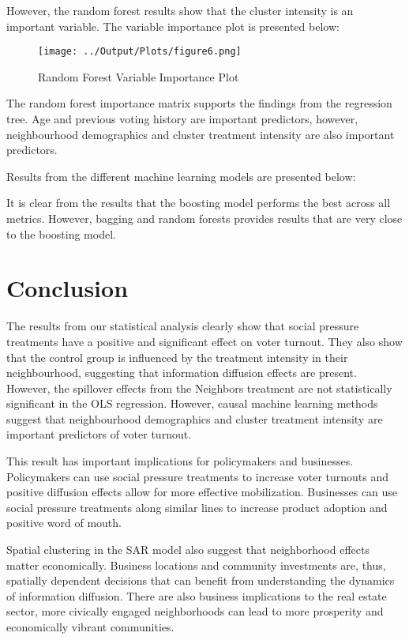 \documentclass[11pt]{article}
\begin{document}
However, the random forest results show that the cluster intensity is an important variable. The variable importance plot is presented below:
\begin{figure}[H]
    \centering
    \texttt{[image: ../Output/Plots/figure6.png]}   
    \caption{Random Forest Variable Importance Plot}
    \label{fig:random_forest}
\end{figure}
The random forest importance matrix supports the findings from the regression tree. Age and previous voting history are important predictors, however, neighbourhood demographics and cluster treatment intensity are also important predictors.

Results from the different machine learning models are presented below:


It is clear from the results that the boosting model performs the best across all metrics. However, bagging and random forests provides results that are very close to the boosting model. 


\section{Conclusion}
The results from our statistical analysis clearly show that social pressure treatments have a positive and significant effect on voter turnout. They also show that the control group is influenced by the treatment intensity in their neighbourhood, suggesting that information diffusion effects are present. However, the spillover effects from the Neighbors treatment are not statistically significant in the OLS regression. However, causal machine learning methods suggest that neighbourhood demographics and cluster treatment intensity are important predictors of voter turnout.

This result has important implications for policymakers and businesses. Policymakers can use social pressure treatments to increase voter turnouts and positive diffusion effects allow for more effective mobilization. Businesses can use social pressure treatments along similar lines to increase product adoption and positive word of mouth. 

Spatial clustering in the SAR model also suggest that neighborhood effects matter economically. Business locations and community investments are, thus, spatially dependent decisions that can benefit from understanding the dynamics of information diffusion. There are also business implications to the real estate sector, more civically engaged neighborhoods can lead to more prosperity and economically vibrant communities.
\end{document}
